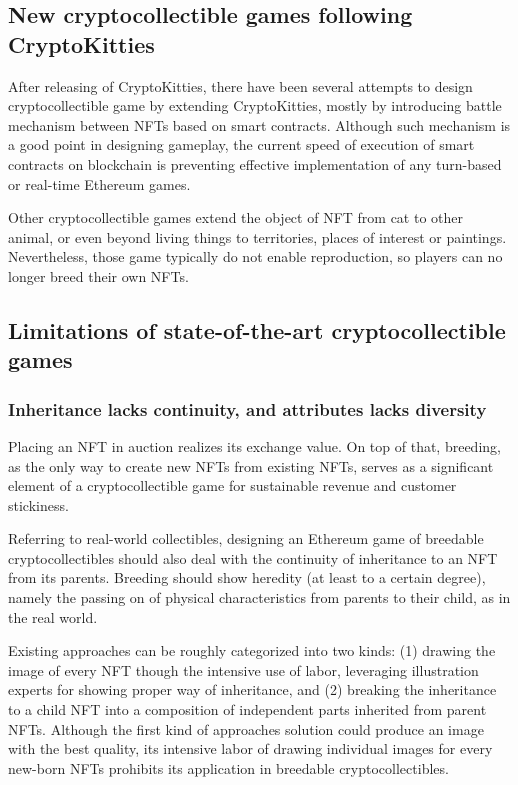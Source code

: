 \documentclass[a4paper]{article}
\begin{document}
\subsection{New cryptocollectible games following CryptoKitties}
After releasing of CryptoKitties, there have been several attempts to design cryptocollectible game by extending CryptoKitties, 
mostly by introducing battle mechanism between NFTs\cite{cryptofighters,fishbank,cryptomons,etheremon} based on smart contracts. 
Although such mechanism is a good point in designing gameplay,
the current speed of execution of smart contracts on blockchain is preventing effective implementation of any turn-based or real-time Ethereum games.

Other cryptocollectible games extend the object of NFT from cat to other animal\cite{cryptopets,etheremon}, or even beyond living things to territories\cite{cryptocountries}, places of interest\cite{cryptolandmarks} or paintings\cite{cryptoarts}. 
Nevertheless, those game typically do not enable reproduction, 
so players can no longer breed their own NFTs.

\subsection{Limitations of state-of-the-art cryptocollectible games}
\subsubsection{Inheritance lacks continuity, and attributes lacks diversity}

Placing an NFT in auction realizes its exchange value. 
On top of that, breeding, as the only way to create new NFTs from existing NFTs, 
serves as a significant element of a cryptocollectible game for sustainable revenue and customer stickiness.

Referring to real-world collectibles, designing an Ethereum game of breedable cryptocollectibles should also deal with the continuity of inheritance to an NFT from its parents. 
Breeding should show heredity (at least to a certain degree), namely the passing on of physical characteristics from parents to their child, as in the real world.

Existing approaches can be roughly categorized into two kinds: (1) drawing the image of every NFT though the intensive use of labor, leveraging illustration experts for showing proper way of inheritance, and (2) breaking the inheritance to a child NFT into a composition of independent parts inherited from parent NFTs. 
Although the first kind of approaches solution could produce an image with the best quality, its intensive labor of drawing individual images for every new-born NFTs prohibits its application in breedable cryptocollectibles.
\end{document}
